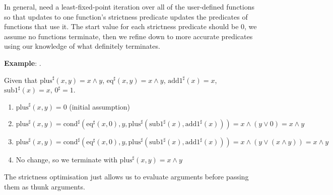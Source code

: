 \documentclass[a4paper, 11pt]{article}
\begin{document}
{    In general, need a least-fixed-point iteration over all of the user-defined functions so that updates to one function's strictness predicate updates the predicates of functions that use it. The start value for each strictness predicate should be 0, we assume no functions terminate, then we refine down to more accurate predicates using our knowledge of what definitely terminates.

    \textbf{Example}: .

    Given that \(\text{plus}^\sharp(x,y) = x \wedge y\), \(\text{eq}^\sharp(x,y) = x \wedge y\), \(\text{add1}^\sharp(x) = x\), \(\text{sub1}^\sharp(x) = x\), \(0^\sharp = 1\).
    \begin{enumerate}
    \item \(\text{plus}^\sharp(x, y) = 0\) (initial assumption)
    \item \(\text{plus}^\sharp(x, y) = \text{cond}^\sharp(\text{eq}^\sharp(x,0), y, \text{plus}^\sharp(\text{sub1}^\sharp(x), \text{add1}^\sharp(x))) = x \wedge (y \vee 0) = x \wedge y\)
    \item \(\text{plus}^\sharp(x, y) = \text{cond}^\sharp(\text{eq}^\sharp(x,0), y, \text{plus}^\sharp(\text{sub1}^\sharp(x), \text{add1}^\sharp(x))) = x \wedge (y \vee (x \wedge y)) = x \wedge y\)
    \item No change, so we terminate with \(\text{plus}^\sharp(x,y) = x \wedge y\)
    \end{enumerate}

    The strictness optimisation just allows us to evaluate arguments before passing them as thunk arguments.
}
\end{document}
